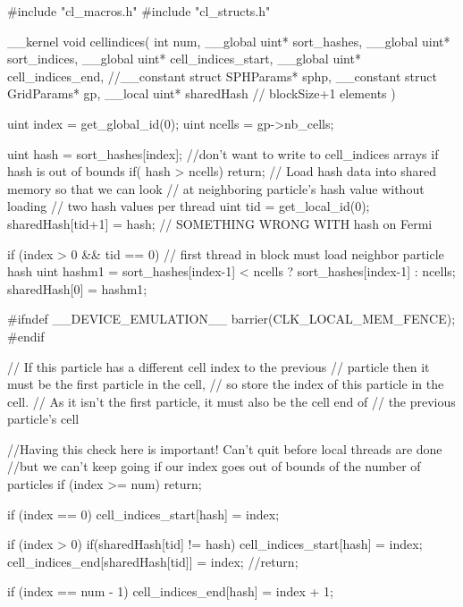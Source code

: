 \begin{cppcode}{0}
#include "cl_macros.h"
#include "cl_structs.h"
        
__kernel void cellindices(
                            int num,
                            __global uint* sort_hashes,
                            __global uint* sort_indices,
                            __global uint* cell_indices_start,
                            __global uint* cell_indices_end,
                            //__constant struct SPHParams* sphp,
                            __constant struct GridParams* gp,
                            __local  uint* sharedHash   // blockSize+1 elements
                            )
{
    uint index = get_global_id(0);
    uint ncells = gp->nb_cells;

    uint hash = sort_hashes[index];
    //don't want to write to cell_indices arrays if hash is out of bounds
    if( hash > ncells)
    {   
        return;
    }   
    // Load hash data into shared memory so that we can look 
    // at neighboring particle's hash value without loading
    // two hash values per thread   
    uint tid = get_local_id(0);
    sharedHash[tid+1] = hash;  // SOMETHING WRONG WITH hash on Fermi

    if (index > 0 && tid == 0)
    {
        // first thread in block must load neighbor particle hash
        uint hashm1 = sort_hashes[index-1] < ncells ? sort_hashes[index-1] : ncells;
        sharedHash[0] = hashm1;
    }

#ifndef __DEVICE_EMULATION__
    barrier(CLK_LOCAL_MEM_FENCE);
#endif

    // If this particle has a different cell index to the previous
    // particle then it must be the first particle in the cell,
    // so store the index of this particle in the cell.
    // As it isn't the first particle, it must also be the cell end of
    // the previous particle's cell

    //Having this check here is important! Can't quit before local threads are done
    //but we can't keep going if our index goes out of bounds of the number of particles
    if (index >= num) return;

    if (index == 0)
    {
        cell_indices_start[hash] = index;
    }

    if (index > 0)
    {
        if(sharedHash[tid] != hash)
        {
            cell_indices_start[hash] = index;
            cell_indices_end[sharedHash[tid]] = index;
        }
    }
    //return;

    if (index == num - 1)
    {
        cell_indices_end[hash] = index + 1;
    }
}

\end{cppcode}

